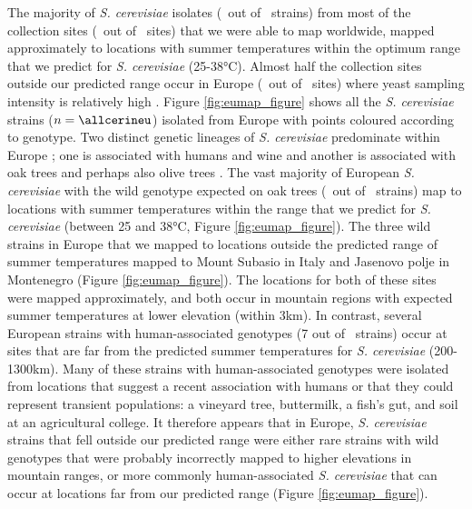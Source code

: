 \documentclass[12pt]{article}
\begin{document}
\begin{linenumbers}
The majority of \textit{S. cerevisiae} isolates (\cerok\ out of \cerinms\ strains) from most of the collection sites (\cersitesok\ out of \cersites\ sites) that we were able to map worldwide, mapped approximately to locations with summer temperatures within the optimum range that we predict for \textit{S. cerevisiae} (25-38\si{\degreeCelsius}). Almost half the collection sites outside our predicted range occur in Europe (\cereusitesnotok\ out of \cersitesnotok\ sites) where yeast sampling intensity is relatively high \citep{robert_yeast_2006,kurtzman_advances_2015}. Figure \ref{fig:eumap_figure} shows all the \textit{S. cerevisiae} strains ($n=\allcerineu$) isolated from Europe with points coloured according to genotype. Two distinct genetic lineages of \textit{S. cerevisiae} predominate within Europe \citep{cromie_genomic_2013,almeida_population_2015}; one is associated with humans and wine and another is associated with oak trees \citep{almeida_population_2015} and perhaps also olive trees \citep{cromie_genomic_2013}. The vast majority of European \textit{S. cerevisiae} with the wild genotype expected on oak trees (\cerineutmaxok\ out of \cerineu\ strains) map to locations with summer temperatures within the range that we predict for \textit{S. cerevisiae} (between 25 and 38\si{\degreeCelsius}, Figure \ref{fig:eumap_figure}). The three wild strains in Europe that we mapped to locations outside the predicted range of summer temperatures mapped to Mount Subasio in Italy and Jasenovo polje in Montenegro (Figure \ref{fig:eumap_figure}). The locations for both of these sites were mapped approximately, and both occur in mountain regions with expected summer temperatures at lower elevation (within 3km). In contrast, several European strains with human-associated genotypes (7 out of \hscerineu\ strains) occur at sites that are far from the predicted summer temperatures for \textit{S. cerevisiae} (200-1300km). Many of these strains with human-associated genotypes were isolated from locations that suggest a recent association with humans or that they could represent transient populations: a vineyard tree, buttermilk, a fish's gut, and soil at an agricultural college. It therefore appears that in Europe, \textit{S. cerevisiae} strains that fell outside our predicted range were either rare strains with wild genotypes that were probably incorrectly mapped to higher elevations in mountain ranges, or more commonly human-associated \textit{S. cerevisiae} that can occur at locations far from our predicted range (Figure \ref{fig:eumap_figure}).


\end{linenumbers}
\end{document}
